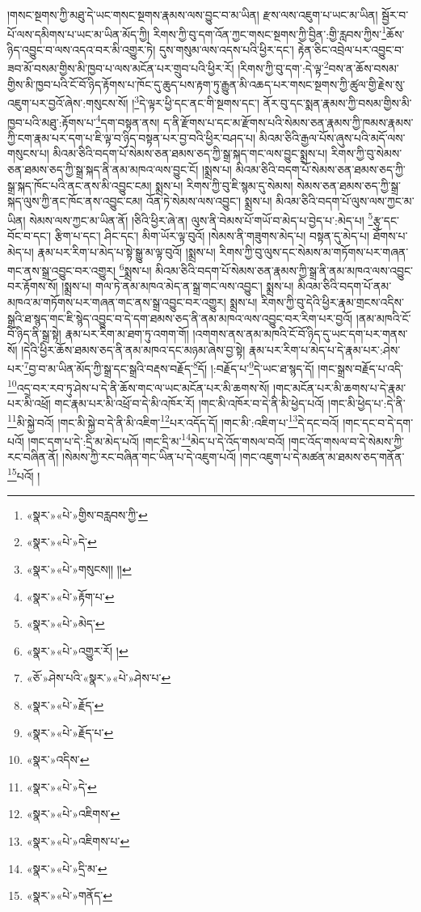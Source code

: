 །གསང་སྔགས་ཀྱི་མཐུ་དེ་ཡང་གསང་སྔགས་རྣམས་ལས་བྱུང་བ་མ་ཡིན། རྫས་ལས་འཇུག་པ་ཡང་མ་ཡིན། སྦྱོར་བ་པོ་ལས་དམིགས་པ་ཡང་མ་ཡིན་མོད་ཀྱི། རིགས་ཀྱི་བུ་དག་འོན་ཀྱང་གསང་སྔགས་ཀྱི་བྱིན་:གྱི་རླབས་ཀྱིས་\footnote{«སྣར་»«པེ་»གྱིས་བརླབས་ཀྱི་}ཆོས་ཉིད་འབྱུང་བ་ལས་འདའ་བར་མི་འགྱུར་ཏེ། དུས་གསུམ་ལས་འདས་པའི་ཕྱིར་དང་། རྟེན་ཅིང་འབྲེལ་པར་འབྱུང་བ་ཟབ་མོ་བསམ་གྱིས་མི་ཁྱབ་པ་ལས་མངོན་པར་གྲུབ་པའི་ཕྱིར་རོ། །རིགས་ཀྱི་བུ་དག་:དེ་ལྟ་\footnote{«སྣར་»«པེ་»དེ་}བས་ན་ཆོས་བསམ་གྱིས་མི་ཁྱབ་པའི་ངོ་བོ་ཉིད་རྟོགས་པ་ཁོང་དུ་ཆུད་པས་རྟག་ཏུ་རྒྱུན་མི་འཆད་པར་གསང་སྔགས་ཀྱི་ཚུལ་གྱི་རྗེས་སུ་འཇུག་པར་བྱའོ་ཞེས་:གསུངས་སོ། །\footnote{«སྣར་»«པེ་»གསུངས།། །།}དེ་ལྟར་ཕྱི་དང་ནང་གི་སྔགས་དང་། ནོར་བུ་དང་སྨན་རྣམས་ཀྱི་བསམ་གྱིས་མི་ཁྱབ་པའི་མཐུ་:རྟོགས་པ་\footnote{«སྣར་»«པེ་»རྟོག་པ་}དག་བསྟན་ནས། ད་ནི་རྫོགས་པ་དང་མ་རྫོགས་པའི་སེམས་ཅན་རྣམས་ཀྱི་ཁམས་རྣམས་ཀྱི་ངག་རྣམ་པར་དག་པ་ཇི་ལྟ་བ་ཉིད་བསྟན་པར་བྱ་བའི་ཕྱིར་བཤད་པ། མིའམ་ཅིའི་རྒྱལ་པོས་ཞུས་པའི་མདོ་ལས་གསུངས་པ། མིའམ་ཅིའི་བདག་པོ་སེམས་ཅན་ཐམས་ཅད་ཀྱི་སྒྲ་སྐད་གང་ལས་བྱུང་སྨྲས་པ། རིགས་ཀྱི་བུ་སེམས་ཅན་ཐམས་ཅད་ཀྱི་སྒྲ་སྐད་ནི་ནམ་མཁའ་ལས་བྱུང་ངོ། །སྨྲས་པ། མིའམ་ཅིའི་བདག་པོ་སེམས་ཅན་ཐམས་ཅད་ཀྱི་སྒྲ་སྐད་ཁོང་པའི་ནང་ནས་མི་འབྱུང་ངམ། སྨྲས་པ། རིགས་ཀྱི་བུ་ཇི་སྙམ་དུ་སེམས། སེམས་ཅན་ཐམས་ཅད་ཀྱི་སྒྲ་སྐད་ལུས་ཀྱི་ནང་ཁོང་ནས་འབྱུང་ངམ། འོན་ཏེ་སེམས་ལས་འབྱུང་། སྨྲས་པ། མིའམ་ཅིའི་བདག་པོ་ལུས་ལས་ཀྱང་མ་ཡིན། སེམས་ལས་ཀྱང་མ་ཡིན་ནོ། །ཅིའི་ཕྱིར་ཞེ་ན། ལུས་ནི་བེམས་པོ་གཡོ་བ་མེད་པ་བྱེད་པ་:མེད་པ། \footnote{«སྣར་»«པེ་»མེད་}རྩྭ་དང་བོང་བ་དང་། རྩིག་པ་དང་། ཤིང་དང་། མིག་ཡོར་ལྟ་བུའོ། །སེམས་ནི་གཟུགས་མེད་པ། བསྟན་དུ་མེད་པ། ཐོགས་པ་མེད་པ། རྣམ་པར་རིག་པ་མེད་པ་སྟེ་སྒྱུ་མ་ལྟ་བུའོ། །སྨྲས་པ། རིགས་ཀྱི་བུ་ལུས་དང་སེམས་མ་གཏོགས་པར་གཞན་གང་ནས་སྒྲ་འབྱུང་བར་འགྱུར། \footnote{«སྣར་»«པེ་»འགྱུར་རོ། ། }སྨྲས་པ། མིའམ་ཅིའི་བདག་པོ་སེམས་ཅན་རྣམས་ཀྱི་སྒྲ་ནི་ནམ་མཁའ་ལས་འབྱུང་བར་རྟོགས་སོ། །སྨྲས་པ། གལ་ཏེ་ནམ་མཁའ་མེད་ན་སྒྲ་གང་ལས་འབྱུང་། སྨྲས་པ། མིའམ་ཅིའི་བདག་པོ་ནམ་མཁའ་མ་གཏོགས་པར་གཞན་གང་ནས་སྒྲ་འབྱུང་བར་འགྱུར། སྨྲས་པ། རིགས་ཀྱི་བུ་དེའི་ཕྱིར་རྣམ་གྲངས་འདིས་སྒྲའི་ཐ་སྙད་གང་ཇི་སྙེད་འབྱུང་བ་དེ་དག་ཐམས་ཅད་ནི་ནམ་མཁའ་ལས་འབྱུང་བར་རིག་པར་བྱའོ། །ནམ་མཁའི་ངོ་བོ་ཉིད་ནི་སྒྲ་སྟེ། རྣམ་པར་རིག་མ་ཐག་ཏུ་འགག་གོ། །འགགས་ནས་ནམ་མཁའི་ངོ་བོ་ཉིད་དུ་ཡང་དག་པར་གནས་སོ། །དེའི་ཕྱིར་ཆོས་ཐམས་ཅད་ནི་ནམ་མཁའ་དང་མཉམ་ཞེས་བྱ་སྟེ། རྣམ་པར་རིག་པ་མེད་པ་དེ་རྣམ་པར་:ཤེས་པར་\footnote{«ཅོ་»ཤེས་པའི་«སྣར་»«པེ་»ཤེས་པ་}བྱ་བ་མ་ཡིན་མོད་ཀྱི་སྒྲ་དང་སྒྲའི་བརྡས་བརྗོད་\footnote{«སྣར་»«པེ་»རྗོད་}དོ། །:བརྗོད་པ་\footnote{«སྣར་»«པེ་»རྗོད་པ་}དེ་ཡང་ཐ་སྙད་དོ། །གང་སྒྲས་བརྗོད་པ་འདི་\footnote{«སྣར་»འདིས་}འདྲ་བར་རབ་ཏུ་ཤེས་པ་དེ་ནི་ཆོས་གང་ལ་ཡང་མངོན་པར་མི་ཆགས་སོ། །གང་མངོན་པར་མི་ཆགས་པ་དེ་རྣམ་པར་མི་འཕྲོ། གང་རྣམ་པར་མི་འཕྲོ་བ་དེ་མི་འཁོར་རོ། །གང་མི་འཁོར་བ་དེ་ནི་མི་ཕྱེད་པའོ། །གང་མི་ཕྱེད་པ་:དེ་ནི་\footnote{«སྣར་»«པེ་»དེ་}མི་སྐྱེ་བའོ། །གང་མི་སྐྱེ་བ་དེ་ནི་མི་འཇིག་\footnote{«སྣར་»«པེ་»འཇིགས་}པར་འདོད་དོ། །གང་མི་:འཇིག་པ་\footnote{«སྣར་»«པེ་»འཇིགས་པ་}དེ་དང་བའོ། །གང་དང་བ་དེ་དག་པའོ། །གང་དག་པ་དེ་:དྲི་མ་མེད་པའོ། །གང་དྲི་མ་\footnote{«སྣར་»«པེ་»དྲི་མ་}མེད་པ་དེ་འོད་གསལ་བའོ། །གང་འོད་གསལ་བ་དེ་སེམས་ཀྱི་རང་བཞིན་ནོ། །སེམས་ཀྱི་རང་བཞིན་གང་ཡིན་པ་དེ་འཇུག་པའོ། །གང་འཇུག་པ་དེ་མཚན་མ་ཐམས་ཅད་གནོན་\footnote{«སྣར་»«པེ་»གནོད་}པའོ། །
